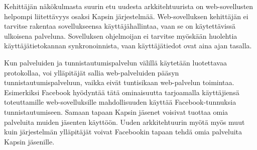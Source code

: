 Kehittäjän näkökulmasta suurin etu uudesta arkkitehtuurista on web-sovellusten helpompi liitettävyys osaksi Kapsin järjestelmää. Web-sovelluksen kehittäjän ei tarvitse rakentaa sovellukseensa käyttäjähallintaa, vaan se on käytettävissä ulkoisena palveluna. Sovelluksen ohjelmoijan ei tarvitse myöskään huolehtia käyttäjätietokannan synkronoinnista, vaan käyttäjätiedot ovat aina ajan tasalla.

Kun palveluiden ja tunnistautumispalvelun välillä käytetään luotettavaa protokollaa, voi ylläpitäjät sallia web-palveluiden pääsyn tunnistautumispalveluun, vaikka eivät tuntisikaan web-palvelun toimintaa. Esimerkiksi Facebook hyödyntää tätä ominaisuutta tarjoamalla käyttäjiensä toteuttamille web-sovelluksille mahdollisuuden käyttää Facebook-tunnuksia tunnistautumiseen. Samaan tapaan Kapsin jäsenet voisivat tuottaa omia palveluita muiden jäsenten käyttöön. Uuden arkkitehtuurin myötä myös muut kuin järjestelmän ylläpitäjät voivat Facebookin tapaan tehdä omia palveluita Kapsin jäsenille.